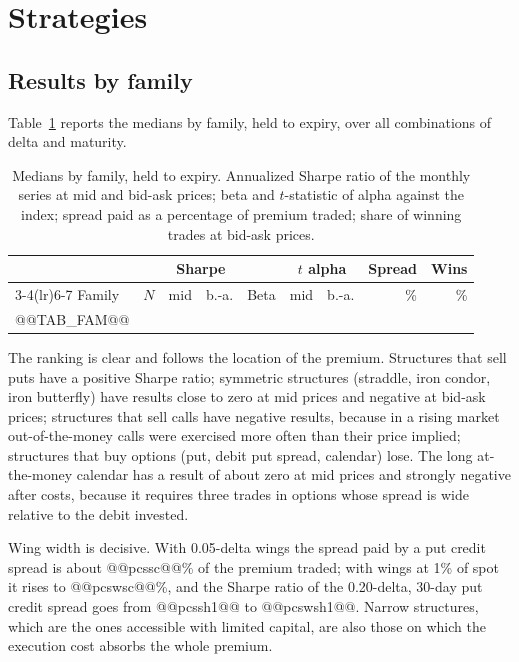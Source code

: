 \documentclass[11pt,a4paper]{article}
\begin{document}
\section{Strategies}\label{sec:strat}

\subsection{Results by family}

Table~\ref{tab:fam} reports the medians by family, held to expiry, over all combinations of delta and maturity.

\begin{table}[ht]\centering\small
\caption{Medians by family, held to expiry. Annualized Sharpe ratio of the monthly series at mid and bid-ask prices; beta and $t$-statistic of alpha against the index; spread paid as a percentage of premium traded; share of winning trades at bid-ask prices.}\label{tab:fam}
\begin{tabular}{lrrrrrrrr}\toprule
 & & \multicolumn{2}{c}{Sharpe} & & \multicolumn{2}{c}{$t$ alpha} & Spread & Wins \\ \cmidrule(lr){3-4}\cmidrule(lr){6-7}
Family & $N$ & mid & b.-a. & Beta & mid & b.-a. & \% & \% \\ \midrule
@@TAB_FAM@@
\bottomrule\end{tabular}\end{table}

The ranking is clear and follows the location of the premium. Structures that sell puts have a positive Sharpe ratio; symmetric structures (straddle, iron condor, iron butterfly) have results close to zero at mid prices and negative at bid-ask prices; structures that sell calls have negative results, because in a rising market out-of-the-money calls were exercised more often than their price implied; structures that buy options (put, debit put spread, calendar) lose. The long at-the-money calendar has a result of about zero at mid prices and strongly negative after costs, because it requires three trades in options whose spread is wide relative to the debit invested.

Wing width is decisive. With 0.05-delta wings the spread paid by a put credit spread is about @@pcssc@@\% of the premium traded; with wings at 1\% of spot it rises to @@pcswsc@@\%, and the Sharpe ratio of the 0.20-delta, 30-day put credit spread goes from @@pcssh1@@ to @@pcswsh1@@. Narrow structures, which are the ones accessible with limited capital, are also those on which the execution cost absorbs the whole premium.
\end{document}
